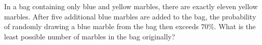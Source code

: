 In a bag containing only blue and yellow marbles, there are exactly eleven yellow marbles. After five additional blue marbles are added to the bag, the probability of randomly drawing a blue marble from the bag then exceeds $70\%$. What is the least possible number of marbles in the bag originally?

